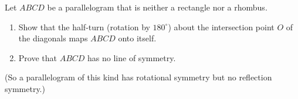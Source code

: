 Let $ABCD$ be a parallelogram that is neither a rectangle nor a rhombus.
\begin{enumerate}
\item[(a)] Show that the half-turn (rotation by $180^\circ$) about the intersection point $O$ of the diagonals maps $ABCD$ onto itself.
\item[(b)] Prove that $ABCD$ has no line of symmetry.
\end{enumerate}
(So a parallelogram of this kind has rotational symmetry but no reflection symmetry.)
